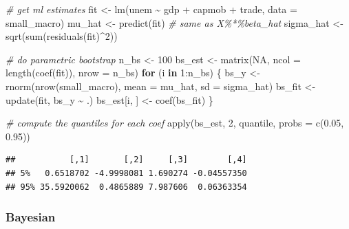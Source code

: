 \documentclass[
]{book}
\newenvironment{Shaded}{\begin{snugshade}}{\end{snugshade}}
\newcommand{\AttributeTok}[1]{\textcolor[rgb]{0.77,0.63,0.00}{#1}}
\newcommand{\CommentTok}[1]{\textcolor[rgb]{0.56,0.35,0.01}{\textit{#1}}}
\newcommand{\ConstantTok}[1]{\textcolor[rgb]{0.00,0.00,0.00}{#1}}
\newcommand{\ControlFlowTok}[1]{\textcolor[rgb]{0.13,0.29,0.53}{\textbf{#1}}}
\newcommand{\DecValTok}[1]{\textcolor[rgb]{0.00,0.00,0.81}{#1}}
\newcommand{\FloatTok}[1]{\textcolor[rgb]{0.00,0.00,0.81}{#1}}
\newcommand{\FunctionTok}[1]{\textcolor[rgb]{0.00,0.00,0.00}{#1}}
\newcommand{\NormalTok}[1]{#1}
\newcommand{\OtherTok}[1]{\textcolor[rgb]{0.56,0.35,0.01}{#1}}
\newcommand{\SpecialCharTok}[1]{\textcolor[rgb]{0.00,0.00,0.00}{#1}}
\begin{document}
\begin{Shaded}
\begin{Highlighting}[]
\CommentTok{\# get ml estimates}
\NormalTok{fit }\OtherTok{\textless{}{-}} \FunctionTok{lm}\NormalTok{(unem }\SpecialCharTok{\textasciitilde{}}\NormalTok{ gdp }\SpecialCharTok{+}\NormalTok{ capmob }\SpecialCharTok{+}\NormalTok{ trade, }\AttributeTok{data =}\NormalTok{ small\_macro)}
\NormalTok{mu\_hat }\OtherTok{\textless{}{-}} \FunctionTok{predict}\NormalTok{(fit)  }\CommentTok{\# same as X\%*\%beta\_hat}
\NormalTok{sigma\_hat }\OtherTok{\textless{}{-}} \FunctionTok{sqrt}\NormalTok{(}\FunctionTok{sum}\NormalTok{(}\FunctionTok{residuals}\NormalTok{(fit)}\SpecialCharTok{\^{}}\DecValTok{2}\NormalTok{))}

\CommentTok{\# do parametric bootstrap}
\NormalTok{n\_bs }\OtherTok{\textless{}{-}} \DecValTok{100}
\NormalTok{bs\_est }\OtherTok{\textless{}{-}} \FunctionTok{matrix}\NormalTok{(}\ConstantTok{NA}\NormalTok{, }\AttributeTok{ncol =} \FunctionTok{length}\NormalTok{(}\FunctionTok{coef}\NormalTok{(fit)), }\AttributeTok{nrow =}\NormalTok{ n\_bs)}
\ControlFlowTok{for}\NormalTok{ (i }\ControlFlowTok{in} \DecValTok{1}\SpecialCharTok{:}\NormalTok{n\_bs) \{}
\NormalTok{  bs\_y }\OtherTok{\textless{}{-}} \FunctionTok{rnorm}\NormalTok{(}\FunctionTok{nrow}\NormalTok{(small\_macro), }\AttributeTok{mean =}\NormalTok{ mu\_hat, }\AttributeTok{sd =}\NormalTok{ sigma\_hat)}
\NormalTok{  bs\_fit }\OtherTok{\textless{}{-}} \FunctionTok{update}\NormalTok{(fit, bs\_y }\SpecialCharTok{\textasciitilde{}}\NormalTok{ .)}
\NormalTok{  bs\_est[i, ] }\OtherTok{\textless{}{-}} \FunctionTok{coef}\NormalTok{(bs\_fit)}
\NormalTok{\}}

\CommentTok{\# compute the quantiles for each coef}
\FunctionTok{apply}\NormalTok{(bs\_est, }\DecValTok{2}\NormalTok{, quantile, }\AttributeTok{probs =} \FunctionTok{c}\NormalTok{(}\FloatTok{0.05}\NormalTok{, }\FloatTok{0.95}\NormalTok{))}
\end{Highlighting}
\end{Shaded}

\begin{verbatim}
##           [,1]       [,2]     [,3]        [,4]
## 5%   0.6518702 -4.9998081 1.690274 -0.04557350
## 95% 35.5920062  0.4865889 7.987606  0.06363354
\end{verbatim}

\hypertarget{bayesian}{%
\subsubsection{Bayesian}\label{bayesian}}
\end{document}
